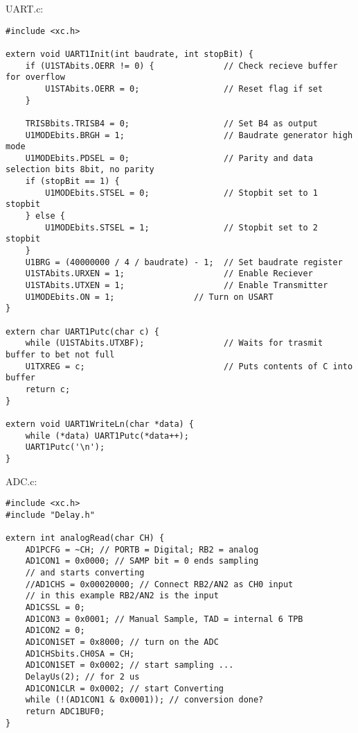 \newpage
UART.c:
\begin{lstlisting}
#include <xc.h>

extern void UART1Init(int baudrate, int stopBit) {
    if (U1STAbits.OERR != 0) {              // Check recieve buffer for overflow
        U1STAbits.OERR = 0;                 // Reset flag if set
    }
    
    TRISBbits.TRISB4 = 0;                   // Set B4 as output
    U1MODEbits.BRGH = 1;                    // Baudrate generator high mode     
    U1MODEbits.PDSEL = 0;                   // Parity and data selection bits 8bit, no parity     
    if (stopBit == 1) {
        U1MODEbits.STSEL = 0;               // Stopbit set to 1 stopbit     
    } else {
        U1MODEbits.STSEL = 1;               // Stopbit set to 2 stopbit     
    }
    U1BRG = (40000000 / 4 / baudrate) - 1;  // Set baudrate register     
    U1STAbits.URXEN = 1;                    // Enable Reciever     
    U1STAbits.UTXEN = 1;                    // Enable Transmitter     
    U1MODEbits.ON = 1;                // Turn on USART 
}

extern char UART1Putc(char c) {
    while (U1STAbits.UTXBF);                // Waits for trasmit buffer to bet not full
    U1TXREG = c;                            // Puts contents of C into buffer
    return c;
}

extern void UART1WriteLn(char *data) {
    while (*data) UART1Putc(*data++);
    UART1Putc('\n');
}
\end{lstlisting}
\newpage
ADC.c:
\begin{lstlisting}
#include <xc.h>
#include "Delay.h"

extern int analogRead(char CH) {
    AD1PCFG = ~CH; // PORTB = Digital; RB2 = analog
    AD1CON1 = 0x0000; // SAMP bit = 0 ends sampling
    // and starts converting
    //AD1CHS = 0x00020000; // Connect RB2/AN2 as CH0 input
    // in this example RB2/AN2 is the input
    AD1CSSL = 0;
    AD1CON3 = 0x0001; // Manual Sample, TAD = internal 6 TPB
    AD1CON2 = 0;
    AD1CON1SET = 0x8000; // turn on the ADC
    AD1CHSbits.CH0SA = CH;
    AD1CON1SET = 0x0002; // start sampling ...
    DelayUs(2); // for 2 us
    AD1CON1CLR = 0x0002; // start Converting
    while (!(AD1CON1 & 0x0001)); // conversion done?
    return ADC1BUF0;
}
\end{lstlisting}